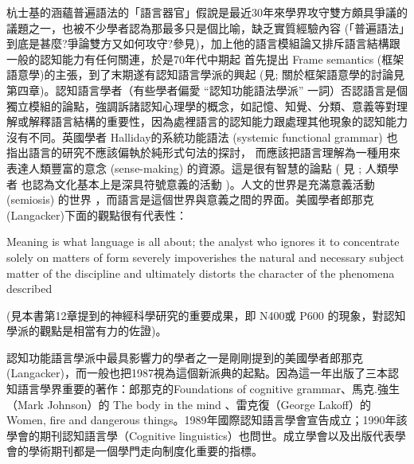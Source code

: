 杭士基的涵蘊普遍語法的「語言器官」假說是最近30年來學界攻守雙方頗具爭議的議題之一，也被不少學者認為那最多只是個比喻，缺乏實質經驗內容 (「普遍語法」到底是甚麼?爭論雙方又如何攻守?參見\citealt{EvansLevinson2009})，加上他的語言模組論又排斥語言結構跟一般的認知能力有任何關連，於是70年代中期起 \citet{Fillmore1976} 首先提出 Frame semantics (框架語意學)的主張，到了末期遂有認知語言學派的興起 (見\citealt{Behme2014}; 關於框架語意學的討論見第四章)。認知語言學者（有些學者偏愛 ``認知功能語法學派'' 一詞）否認語言是個獨立模組的論點，強調訴諸認知心理學的概念，如記憶、知覺、分類、意義等對理解或解釋語言結構的重要性，因為處裡語言的認知能力跟處理其他現象的認知能力沒有不同。英國學者 Halliday的系統功能語法 (systemic functional grammar) 也指出語言的研究不應該偏執於純形式句法的探討， 而應該把語言理解為一種用來表達人類豐富的意念 (sense-making) 的資源。這是很有智慧的論點 ( 見 \citealt{HallidayMatthiessen2004}; 人類學者 \citet{Geertz1983} 也認為文化基本上是深具符號意義的活動 )。人文的世界是充滿意義活動 (semiosis) 的世界 ，而語言是這個世界與意義之間的界面。美國學者郎那克 (Langacker)下面的觀點很有代表性：

Meaning is what language is all about; the analyst who ignores it to concentrate solely on matters of form severely impoverishes the natural and necessary subject matter of the discipline and ultimately distorts the character of the phenomena described \citep[12]{Langacker1987}

(見本書第12章提到的神經科學研究的重要成果，即 N400或 P600 的現象，對認知學派的觀點是相當有力的佐證)。

認知功能語言學派中最具影響力的學者之一是剛剛提到的美國學者郎那克   (Langacker)，而一般也把1987視為這個新派典的起點。因為這一年出版了三本認知語言學界重要的著作：郎那克的Foundations of cognitive grammar、馬克.強生（Mark Johnson）的 The body in the mind 、雷克復（George Lakoff）的 Women, fire and dangerous things。1989年國際認知語言學會宣告成立；1990年該學會的期刊認知語言學（Cognitive linguistics）也問世。成立學會以及出版代表學會的學術期刊都是一個學門走向制度化重要的指標。


